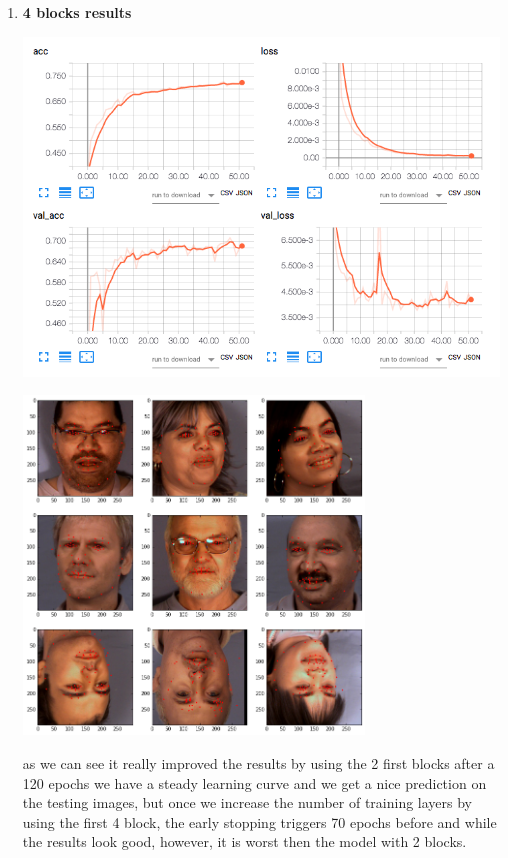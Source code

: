 \documentclass[11pt]{article}
\begin{document}
\begin{enumerate}
\begin{enumerate}
\pagebreak

\item \textbf{4 blocks results}
\label{sec:orga9a1dc4}

\centerline{\includegraphics[height=9cm]{./images/incep197Loss.png}}
\centerline{\includegraphics[height=9cm]{./images/incep197res.png}}


\pagebreak
as we can see it really improved the results by using the 2 first blocks after a
120 epochs we have a steady learning curve and we get a nice prediction on the
testing images, but once we increase the number of training layers by using
the first 4 block, the early stopping triggers 70 epochs before and while
the results look good, however, it is worst then the model with 2 blocks.
\end{enumerate}
\end{enumerate}
\end{document}
